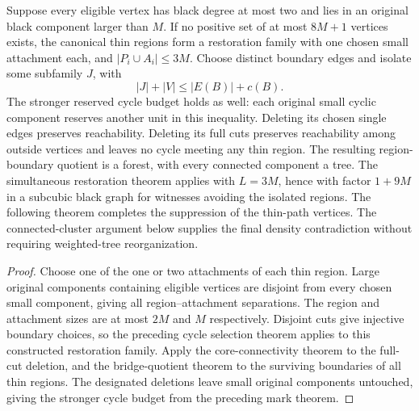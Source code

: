 \begin{theorem}
  \label{thm:lowerbounds-algebraic-constructed-thin-family}
  \leanok
  Suppose every eligible vertex has black degree at most two and lies in
  an original black component larger than $M$. If no positive set of at
  most $8M+1$ vertices exists, the canonical thin regions form a restoration
  family with one chosen small attachment each, and
  $|P_i\cup A_i|\le3M$. Choose distinct boundary edges and isolate some
  subfamily $J$, with
  \[
    |J|+|V|\le |E(B)|+c(B).
  \]
  The stronger reserved cycle budget holds as well: each original small
  cyclic component reserves another unit in this inequality.
  Deleting its chosen single edges preserves reachability. Deleting its
  full cuts preserves reachability among outside vertices and leaves no
  cycle meeting any thin region. The resulting region-boundary quotient
  is a forest, with every connected component a tree. The simultaneous
  restoration theorem applies with $L=3M$, hence with factor $1+9M$ in
  a subcubic black graph for witnesses avoiding the isolated regions.
  The following theorem completes the suppression of the thin-path
  vertices. The connected-cluster argument below supplies the final density
  contradiction without requiring weighted-tree reorganization.
\end{theorem}
\begin{proof}
  \leanok
  Choose one of the one or two attachments of each thin region. Large
  original components containing eligible vertices are disjoint from every
  chosen small component, giving all region--attachment separations.
  The region and attachment sizes are at most $2M$ and $M$ respectively.
  Disjoint cuts give injective boundary choices, so the preceding cycle
  selection theorem applies to this constructed restoration family.
  Apply the core-connectivity theorem to the full-cut deletion, and the
  bridge-quotient theorem to the surviving boundaries of all thin regions.
  The designated deletions leave small original components untouched,
  giving the stronger cycle budget from the preceding mark theorem.
\end{proof}

